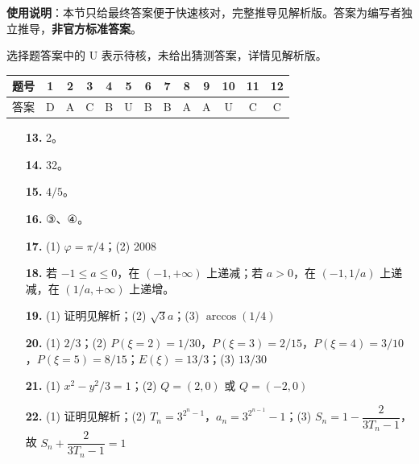 
\begin{gknotice}
\textbf{使用说明}：本节只给最终答案便于快速核对，完整推导见解析版。答案为编写者独立推导，\textbf{非官方标准答案}。
\end{gknotice}

\begin{gknotice}
选择题答案中的 U 表示待核，未给出猜测答案，详情见解析版。
\end{gknotice}

\begin{center}\begin{tabular}{ccccccccccccc}
\toprule
题号 & 1 & 2 & 3 & 4 & 5 & 6 & 7 & 8 & 9 & 10 & 11 & 12 \\
\midrule
答案 & D & A & C & B & U & B & B & A & A & U & C & C \\
\bottomrule
\end{tabular}\end{center}

\begin{itemize}[leftmargin=2.6em]
  \item[\textbf{13.}] 2。
  \item[\textbf{14.}] 32。
  \item[\textbf{15.}] $4/5$。
  \item[\textbf{16.}] ③、④。
\end{itemize}

\begin{itemize}[leftmargin=2.6em]
  \item[\textbf{17.}] (1) $\varphi=\pi/4$；(2) 2008
  \item[\textbf{18.}] 若 $-1\le a\le0$，在 $(-1,+\infty)$ 上递减；若 $a>0$，在 $(-1,1/a)$ 上递减，在 $(1/a,+\infty)$ 上递增。
  \item[\textbf{19.}] (1) 证明见解析；(2) $\sqrt3a$；(3) $\arccos(1/4)$
  \item[\textbf{20.}] (1) $2/3$；(2) $P(\xi=2)=1/30$，$P(\xi=3)=2/15$，$P(\xi=4)=3/10$，$P(\xi=5)=8/15$；$E(\xi)=13/3$；(3) $13/30$
  \item[\textbf{21.}] (1) $x^2-y^2/3=1$；(2) $Q=(2,0)$ 或 $Q=(-2,0)$
  \item[\textbf{22.}] (1) 证明见解析；(2) $T_n=3^{2^n-1}$，$a_n=3^{2^{n-1}}-1$；(3) $S_n=1-\dfrac{2}{3T_n-1}$，故 $S_n+\dfrac{2}{3T_n-1}=1$
\end{itemize}
